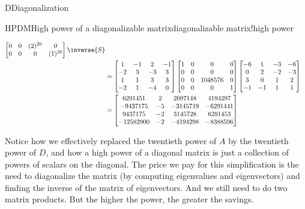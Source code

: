 \begin{subsect}{D}{Diagonalization}
\begin{example}{HPDM}{High power of a diagonalizable matrix}{diagonalizable matrix!high power}
\begin{para}
\begin{align*}
\begin{bmatrix}
 0 & 0 & (2)^{20} & 0 \\
 0 & 0 & 0 & (1)^{20}
\end{bmatrix}
\inverse{S}\\
&=
\begin{bmatrix}
 1 & -1 & 2 & -1 \\
 -2 & 3 & -3 & 3 \\
 1 & 1 & 3 & 3 \\
 -2 & 1 & -4 & 0
\end{bmatrix}
\begin{bmatrix}
 1 & 0 & 0 & 0 \\
 0 & 0 & 0 & 0 \\
 0 & 0 & 1048576 & 0 \\
 0 & 0 & 0 & 1
\end{bmatrix}
\begin{bmatrix}
 -6 & 1 & -3 & -6 \\
 0 & 2 & -2 & -3 \\
 3 & 0 & 1 & 2 \\
 -1 & -1 & 1 & 1
\end{bmatrix}\\
%
&=
\begin{bmatrix}
 6291451 & 2 & 2097148 & 4194297 \\
 -9437175 & -5 & -3145719 & -6291441 \\
 9437175 & -2 & 3145728 &  6291453 \\
 -12582900 & -2 & -4194298 & -8388596
\end{bmatrix}
%
\end{align*}
\end{para}
%
\begin{para}Notice how we effectively replaced the twentieth power of $A$ by the twentieth power of $D$, and how a high power of a diagonal matrix is just a collection of powers of scalars on the diagonal.  The price we pay for this simplification is the need to diagonalize the matrix (by computing eigenvalues and eigenvectors) and finding the inverse of the matrix of eigenvectors.  And we still need to do two matrix products.  But the higher the power, the greater the savings.\end{para}
%
\end{example}
%
\end{subsect}
%
